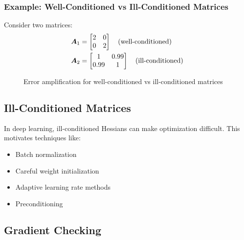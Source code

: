 \subsubsection{Example: Well-Conditioned vs Ill-Conditioned Matrices}

Consider two matrices:
\begin{align}
\boldsymbol{A}_1 &= \begin{bmatrix} 2 & 0 \\ 0 & 2 \end{bmatrix} \quad \text{(well-conditioned)} \\
\boldsymbol{A}_2 &= \begin{bmatrix} 1 & 0.99 \\ 0.99 & 1 \end{bmatrix} \quad \text{(ill-conditioned)}
\end{align}

\begin{figure}[h]
\centering
{}
\caption{Error amplification for well-conditioned vs ill-conditioned matrices}
\label{fig:condition-number}
\end{figure}

\subsection{Ill-Conditioned Matrices}

In deep learning, ill-conditioned Hessians can make optimization difficult. This motivates techniques like:
\begin{itemize}
    \item Batch normalization
    \item Careful weight initialization
    \item Adaptive learning rate methods
    \item Preconditioning
\end{itemize}

\subsection{Gradient Checking}

